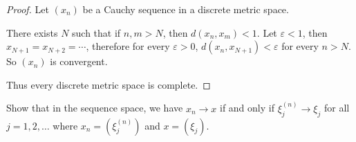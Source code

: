 \begin{proof}
    Let $(x_{n})$ be a Cauchy sequence in a discrete metric space.

    There exists $N$ such that if $n, m > N$, then $d(x_{n}, x_{m}) < 1$. Let $\varepsilon < 1$, then $x_{N+1} = x_{N+2} = \cdots$, therefore for every $\varepsilon > 0$, $d(x_{n}, x_{N+1}) < \varepsilon$ for every $n > N$. So $(x_{n})$ is convergent.

    Thus every discrete metric space is complete.
\end{proof}

\begin{exercise}[Space $s$]\label{chapter1:section5:exercise11}
    Show that in the sequence space, we have $x_{n}\to x$ if and only if $\xi^{(n)}_{j}\to \xi_{j}$ for all $j = 1, 2, \ldots$ where $x_{n} = {(\xi_{j}^{(n)})}$ and $x = (\xi_{j})$.
\end{exercise}

